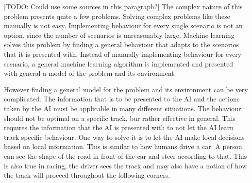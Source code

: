 [TODO: Could use some sources in this paragraph?]
The complex nature of this problem presents quite a few problems. Solving complex problems like these manually is not easy. Implementing behaviour for every single scenario is not an option, since the number of scenarios is unreasonably large. Machine learning solves this problem by finding a general behaviour that adapts to the scenarios that it is presented with. Instead of manually implementing behaviour for every scenario, a general machine learning algorithm is implemented and presented with general a model of the problem and its environment.

However finding a general model for the problem and its environment can be very complicated. The information that is to be presented to the AI and the actions taken by the AI must be applicable in many different situations. The behaviour should not be optimal on a specific track, bur rather effective in general. This requires the information that the AI is presented with to not let the AI learn track specific behaviour. One way to solve it is to let the AI make local decisions based on local information. This is similar to how humans drive a car. A person can see the shape of the road in front of the car and steer according to that. This is also true in racing, the driver sees the track and may also have a notion of how the track will proceed throughout the following corners.



